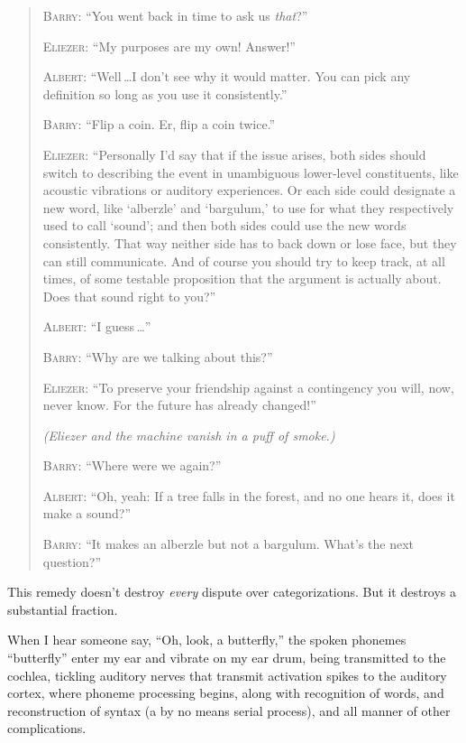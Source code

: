 {\begin{quotation}
 \textsc{Barry}: ``You went back in time to ask us
\textit{that}?''


 \textsc{Eliezer}: ``My purposes are my own!
Answer!''


 \textsc{Albert}: ``Well\,\ldots I don't see
why it would matter. You can pick any definition so long as you use it
consistently.''


 \textsc{Barry}: ``Flip a coin. Er, flip a coin
twice.''


 \textsc{Eliezer}: ``Personally I'd say
that if the issue arises, both sides should switch to describing the
event in unambiguous lower-level constituents, like acoustic vibrations
or auditory experiences. Or each side could designate a new word, like
`alberzle' and
`bargulum,' to use for what they
respectively used to call `sound'; and
then both sides could use the new words consistently. That way neither
side has to back down or lose face, but they can still communicate. And
of course you should try to keep track, at all times, of some testable
proposition that the argument is actually about. Does that sound right
to you?''


 \textsc{Albert}: ``I guess\,\ldots''


 \textsc{Barry}: ``Why are we talking about
this?''


 \textsc{Eliezer}: ``To preserve your friendship against a
contingency you will, now, never know. For the future has already
changed!''


 \textit{(Eliezer and the machine vanish in a puff of smoke.)}


 \textsc{Barry}: ``Where were we
again?''


 \textsc{Albert}: ``Oh, yeah: If a tree falls in the
forest, and no one hears it, does it make a sound?''

{
 \textsc{Barry}: ``It makes an alberzle but not a bargulum.
What's the next question?''}
\end{quotation}


 This remedy doesn't destroy \textit{every} dispute
over categorizations. But it destroys a substantial fraction.

\myendsectiontext



 When I hear someone say, ``Oh, look, a
butterfly,'' the spoken phonemes
``butterfly'' enter my ear and
vibrate on my ear drum, being transmitted to the cochlea, tickling
auditory nerves that transmit activation spikes to the auditory cortex,
where phoneme processing begins, along with recognition of words, and
reconstruction of syntax (a by no means serial process), and all manner
of other complications. 


}

